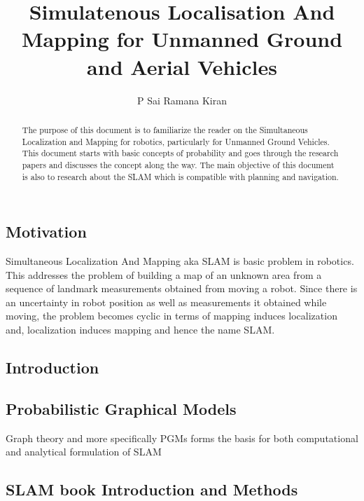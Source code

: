 \documentclass{article}
\title{Simulatenous Localisation And Mapping for Unmanned Ground and Aerial Vehicles}
\author{P Sai Ramana Kiran}
\begin{document}
\maketitle

\begin{abstract}
	The purpose of this document is to familiarize the reader on the Simultaneous Localization and Mapping for robotics, particularly for Unmanned Ground Vehicles. This document starts with basic concepts of probability and goes through the research papers and discusses the concept along the way. 
	The main objective of this document is also to research about the SLAM which is compatible with planning and navigation. 
\end{abstract}

\newpage

\begin{center}{\section*{Motivation}}\end{center}

Simultaneous Localization And Mapping aka SLAM is basic problem in robotics. This addresses the problem of building a map of an unknown area from a sequence of landmark measurements obtained from moving a robot. Since there is an uncertainty in robot position as well as measurements it obtained while moving, the problem becomes cyclic in terms of mapping induces localization and, localization induces mapping and hence the name SLAM. 

\newpage
 \begin{center}
 	\section*{Introduction}
 \end{center}
\newpage
\tableofcontents
\newpage
\begin{center}
	\section*{Probabilistic Graphical Models}
\end{center}
 Graph theory and more specifically PGMs forms the basis for both computational and analytical formulation of SLAM

\newpage

\begin{center}\section*{SLAM book Introduction and Methods}\end{center} 
\end{document}
